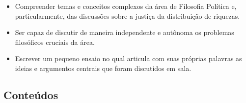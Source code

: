 \documentclass[
	article,			%
	12pt,				%
	twoside,			%
	a4paper,			%
	english,			%
	brazil,				%
	sumario=tradicional
]{abntex2-modelo-plano-de-aula}
\begin{document}
\begin{itemize}

	\item Compreender temas e conceitos complexos da área de Filosofia Política e, particularmente, das discussões sobre a justiça da distribuição de riquezas.
	\item Ser capaz de discutir de maneira independente e autônoma os problemas filosóficos cruciais da área.
	\item  Escrever um  pequeno ensaio no qual articula com suas próprias palavras as ideias e argumentos centrais que foram discutidos em sala.

\end{itemize}

\newpage


\begin{snugshade}
	\section{Conteúdos} %
\end{snugshade}
\end{document}
